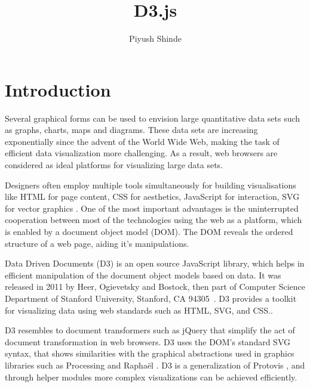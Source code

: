\documentclass[9pt,twocolumn,twoside]{../../styles/osajnl}
\title{D3.js}
\author[1,*]{Piyush Shinde}
\affil[1]{School of Informatics and Computing, Bloomington, IN 47408, U.S.A.}
\affil[*]{Corresponding authors: piyushsshinde1992@gmail.com}
\begin{document}
\maketitle
{}
\section{Introduction}

Several graphical forms can be used to envision large quantitative data sets such as graphs, charts, maps and diagrams. These data sets are increasing exponentially since the advent of the World Wide Web, making the task of efficient data visualization more challenging. As a result, web browsers are considered as ideal platforms for visualizing large data sets.

Designers often employ multiple tools simultaneously for building visualisations \SE like HTML for page content, CSS for aesthetics, JavaScript for interaction, SVG
for vector graphics \cite{paper-d3}. One of the most important advantages is the uninterrupted cooperation between most of the technologies using the web as a platform, which is enabled by a document object model (DOM). The DOM reveals the ordered structure of a web page, aiding it's manipulations.

Data Driven Documents (D3) is an open source JavaScript library, which helps in efficient manipulation of the document object models based on data. It was released in 2011 by Heer, Ogievetsky and Bostock, then part of Computer Science Department of Stanford University, Stanford, CA 94305\
. D3 provides a toolkit for visualizing data using web standards such as HTML, SVG, and CSS.\cite{www-git}.

D3 resembles to document transformers such as jQuery \CE that simplify the act of document transformation in web browsers. D3 uses the DOM’s standard SVG syntax, that shows similarities with the graphical abstractions used in graphics libraries such as Processing and Raphaël \CE. D3 is a generalization of Protovis \CE, and through helper modules more complex visualizations can be  achieved efficiently.
\end{document}
